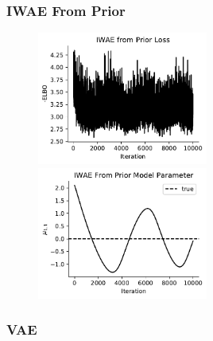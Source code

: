 \subsubsection{IWAE From Prior}

\begin{figure}[!htb]
    \centering
    \includegraphics[width=0.5\textwidth]{figures/gmm-open-universe/iwae_from_prior_loss}
    \includegraphics[width=0.5\textwidth]{figures/gmm-open-universe/iwae_from_prior_model_param}
\end{figure}

\subsubsection{VAE}

